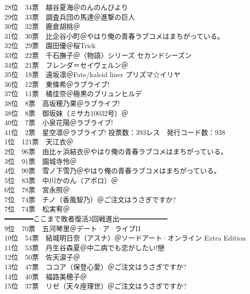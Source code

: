 {    28位　34票　越谷夏海＠のんのんびより\\
    29位　33票　調査兵団の馬達＠進撃の巨人\\
    30位　32票　鹿倉胡桃＠\Saki\\
    31位　30票　比企谷小町＠やはり俺の青春ラブコメはまちがっている。\\
    32位　29票　園田優＠桜Trick\\
    33位　22票　千石撫子＠〈物語〉シリーズ セカンドシーズン\\
    34位　21票　フレンダ＝セイヴェルン＠\Railgan\\
    35位　18票　遠坂凛＠Fate/kaleid liner プリズマ☆イリヤ\\
    36位　12票　東條希＠ラブライブ!\\
    37位　11票　橘佳奈＠極黒のブリュンヒルデ\\
    38位　8票　高坂穂乃果＠ラブライブ!\\
    38位　8票　御坂妹（ミサカ10032号）＠\Railgan\\
    40位　7票　小泉花陽＠ラブライブ!\\
    41位　2票　星空凛＠ラブライブ!
}{
    投票数：393レス　発行コード数：938\\
    1位　121票　天江衣＠\Saki\\
    2位　96票　由比ヶ浜結衣＠やはり俺の青春ラブコメはまちがっている。\\
    3位　91票　園城寺怜＠\Saki\\
    4位　90票　雪ノ下雪乃＠やはり俺の青春ラブコメはまちがっている。\\
    5位　83票　中川かのん（アポロ）＠\Kaminomi\\
    6位　78票　宮永照＠\Saki\\
    7位　74票　チノ（香風智乃）＠ご注文はうさぎですか?\\
    7位　74票　松実宥＠\Saki\\
    ━━━━━━━ここまで敗者復活3回戦進出━━━━━━━\\
    9位　70票　五河琴里＠デート·ア·ライブII\\
    10位　54票　結城明日奈（アスナ）＠ソードアート·オンライン Extra Edition\\
    11位　53票　丹生谷森夏＠中二病でも恋がしたい!戀\\
    12位　50票　佐天涙子＠\Railgan\\
    13位　47票　ココア（保登心愛）＠ご注文はうさぎですか?\\
    14位　40票　福路美穂子＠\Saki\\
    15位　37票　リゼ（天々座理世）＠ご注文はうさぎですか?\\
}
